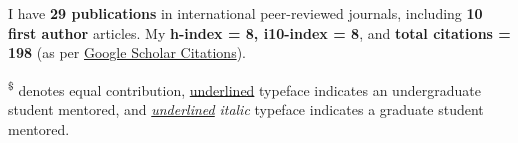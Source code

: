 

\hfill
\par

I have \textbf{29 publications} in international peer-reviewed journals, including \textbf{10 first author} articles. My \textbf{h-index = 8, i10-index = 8}, and \textbf{total citations = 198} (as per \href{https://scholar.google.com/citations?user=kvf8JJQAAAAJ&hl=en}{Google Scholar Citations}).
\nocite{*}

\begin{footnotesize}  
    \textsuperscript{\$} denotes equal contribution, \underline{underlined} typeface indicates an undergraduate student mentored, and \textit{\underline{underlined}} \textit{italic} typeface indicates
     a graduate student mentored.
    \end{footnotesize}

\printbibliography[heading={subbibliography},title={Journal Articles},type=article]
\printbibliography[heading={subbibliography},title={Under Review},type=unpublished]
\printbibliography[heading={subbibliography},title={Manuals},type=manual]
\printbibliography[heading={subbibliography},title={Abstract / Oral / Conferences},type=inbook]
\printbibliography[heading={subbibliography},title={Other Conferences and Workshops },type=misc]





